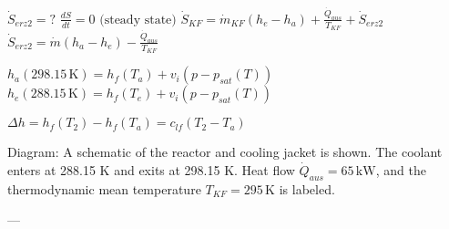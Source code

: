 \( \dot{S}_{erz2} = ? \)  
\( \frac{dS}{dt} = 0 \text{ (steady state)} \)  
\( \dot{S}_{KF} = \dot{m}_{KF}(h_e - h_a) + \frac{\dot{Q}_{aus}}{T_{KF}} + \dot{S}_{erz2} \)  
\( \dot{S}_{erz2} = \dot{m}(h_a - h_e) - \frac{\dot{Q}_{aus}}{T_{KF}} \)  

\( h_a(298.15 \, \text{K}) = h_f(T_a) + v_i(p - p_{sat}(T)) \)  
\( h_e(288.15 \, \text{K}) = h_f(T_e) + v_i(p - p_{sat}(T)) \)  

\( \Delta h = h_f(T_2) - h_f(T_a) = c_{lf}(T_2 - T_a) \)  

Diagram:  
A schematic of the reactor and cooling jacket is shown. The coolant enters at 288.15 K and exits at 298.15 K. Heat flow \( \dot{Q}_{aus} = 65 \, \text{kW} \), and the thermodynamic mean temperature \( T_{KF} = 295 \, \text{K} \) is labeled.  

---